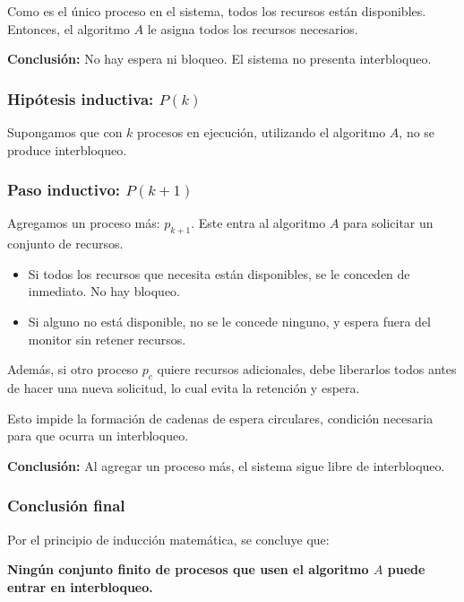 Como es el único proceso en el sistema, todos los recursos están disponibles. Entonces, el algoritmo \( A \) le asigna todos los recursos necesarios.

\textbf{Conclusión:} No hay espera ni bloqueo. El sistema no presenta interbloqueo.

\subsubsection{Hipótesis inductiva: \( P(k) \)}

Supongamos que con \( k \) procesos en ejecución, utilizando el algoritmo \( A \), no se produce interbloqueo.

\subsubsection{Paso inductivo: \( P(k+1) \)}

Agregamos un proceso más: \( p_{k+1} \). Este entra al algoritmo \( A \) para solicitar un conjunto de recursos.

\begin{itemize}
    \item Si todos los recursos que necesita están disponibles, se le conceden de inmediato. No hay bloqueo.
    \item Si alguno no está disponible, no se le concede ninguno, y espera fuera del monitor sin retener recursos.
\end{itemize}

Además, si otro proceso \( p_c \) quiere recursos adicionales, debe liberarlos todos antes de hacer una nueva solicitud, lo cual evita la retención y espera.

Esto impide la formación de cadenas de espera circulares, condición necesaria para que ocurra un interbloqueo.

\textbf{Conclusión:} Al agregar un proceso más, el sistema sigue libre de interbloqueo.

\subsubsection{Conclusión final}

Por el principio de inducción matemática, se concluye que:

\begin{center}
\textbf{Ningún conjunto finito de procesos que usen el algoritmo \( A \) puede entrar en interbloqueo.}
\end{center}